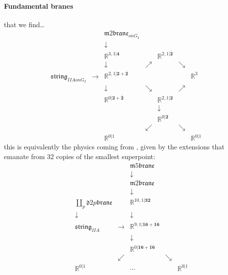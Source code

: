\documentclass[12pt,titlepage]{article}
\newcommand{\itexarray}[1]{\begin{matrix}#1\end{matrix}}
\theoremstyle{plain}
\theoremstyle{definition}
\theoremstyle{remark}
\begin{document}
\hypertarget{fundamental_branes}{}\paragraph*{{Fundamental branes}}\label{fundamental_branes}
 that we find\ldots{}
\begin{displaymath}
\itexarray{
&& \mathfrak{m}2\mathfrak{brane}_{onG_2}
\\
&& \downarrow
\\
&& \mathbb{R}^{3,1|\mathbf{4}}  &&  \mathbb{R}^{2,1|\overline{\mathbf{2}}}
\\
&& \downarrow & \nearrow&  & \searrow
\\
\mathfrak{string}_{IIAonG_2} &\longrightarrow& \mathbb{R}^{2,1|\mathbf{2}+\overline{\mathbf{2}}} &&  && \mathbb{R}^{3}
\\
&& \downarrow &\searrow&  & \nearrow
\\
&& \mathbb{R}^{0|\mathbf{2}+\overline{\mathbf{2}}} &&  \mathbb{R}^{2,1|\mathbf{2}}
\\
&& && \downarrow
\\
&& && \mathbb{R}^{0|\mathbf{2}}
\\
&& & \swarrow && \searrow
\\
&& \mathbb{R}^{0|1} && && \mathbb{R}^{0|1}
}
\end{displaymath}
this is equivalently the physics coming from , given by the extensions that emanate from 32 copies of the smallest superpoint:
\begin{displaymath}
\itexarray{
&& && \mathfrak{m}5\mathfrak{brane}
\\
&& && \downarrow
\\
&& && \mathfrak{m}2\mathfrak{brane}
\\
&& && \downarrow
\\
&& \underset{p}{\coprod} \mathfrak{d}{2p}\mathfrak{brane} && \mathbb{R}^{10,1|\mathbf{32}}
\\
&& \downarrow && \downarrow
\\
&& \mathfrak{string}_{IIA} &\longrightarrow & \mathbb{R}^{9,1|\mathbf{16}+\overline{\mathbf{16}}}
\\
&& && \downarrow
\\
&& && \mathbb{R}^{0|\mathbf{16}+\overline{\mathbf{16}}}
\\
&& & \swarrow && \searrow
\\
&& \mathbb{R}^{0|1} && \cdots  && \mathbb{R}^{0|1}
}
\end{displaymath}
\end{document}
